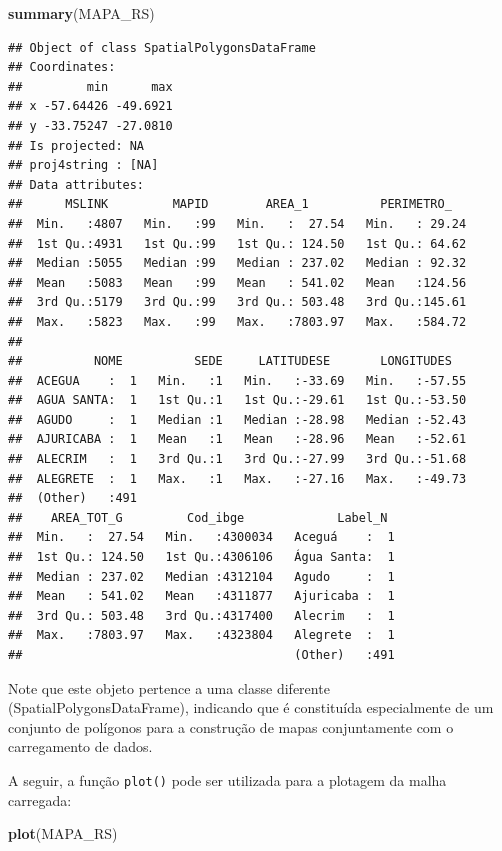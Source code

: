 \documentclass[12pt,brazil,]{book}
\newenvironment{Shaded}{\begin{snugshade}}{\end{snugshade}}
\newcommand{\KeywordTok}[1]{\textcolor[rgb]{0.13,0.29,0.53}{\textbf{#1}}}
\newcommand{\NormalTok}[1]{#1}
\begin{document}
\begin{Shaded}
\begin{Highlighting}[]
\KeywordTok{summary}\NormalTok{(MAPA_RS)}
\end{Highlighting}
\end{Shaded}

\begin{verbatim}
## Object of class SpatialPolygonsDataFrame
## Coordinates:
##         min      max
## x -57.64426 -49.6921
## y -33.75247 -27.0810
## Is projected: NA 
## proj4string : [NA]
## Data attributes:
##      MSLINK         MAPID        AREA_1          PERIMETRO_    
##  Min.   :4807   Min.   :99   Min.   :  27.54   Min.   : 29.24  
##  1st Qu.:4931   1st Qu.:99   1st Qu.: 124.50   1st Qu.: 64.62  
##  Median :5055   Median :99   Median : 237.02   Median : 92.32  
##  Mean   :5083   Mean   :99   Mean   : 541.02   Mean   :124.56  
##  3rd Qu.:5179   3rd Qu.:99   3rd Qu.: 503.48   3rd Qu.:145.61  
##  Max.   :5823   Max.   :99   Max.   :7803.97   Max.   :584.72  
##                                                                
##          NOME          SEDE     LATITUDESE       LONGITUDES    
##  ACEGUA    :  1   Min.   :1   Min.   :-33.69   Min.   :-57.55  
##  AGUA SANTA:  1   1st Qu.:1   1st Qu.:-29.61   1st Qu.:-53.50  
##  AGUDO     :  1   Median :1   Median :-28.98   Median :-52.43  
##  AJURICABA :  1   Mean   :1   Mean   :-28.96   Mean   :-52.61  
##  ALECRIM   :  1   3rd Qu.:1   3rd Qu.:-27.99   3rd Qu.:-51.68  
##  ALEGRETE  :  1   Max.   :1   Max.   :-27.16   Max.   :-49.73  
##  (Other)   :491                                                
##    AREA_TOT_G         Cod_ibge             Label_N   
##  Min.   :  27.54   Min.   :4300034   Aceguá    :  1  
##  1st Qu.: 124.50   1st Qu.:4306106   Água Santa:  1  
##  Median : 237.02   Median :4312104   Agudo     :  1  
##  Mean   : 541.02   Mean   :4311877   Ajuricaba :  1  
##  3rd Qu.: 503.48   3rd Qu.:4317400   Alecrim   :  1  
##  Max.   :7803.97   Max.   :4323804   Alegrete  :  1  
##                                      (Other)   :491
\end{verbatim}

Note que este objeto pertence a uma classe diferente
(SpatialPolygonsDataFrame), indicando que é constituída especialmente de
um conjunto de polígonos para a construção de mapas conjuntamente com o
carregamento de dados.

A seguir, a função \texttt{plot()} pode ser utilizada para a plotagem da
malha carregada:

\begin{Shaded}
\begin{Highlighting}[]
\KeywordTok{plot}\NormalTok{(MAPA_RS)}
\end{Highlighting}
\end{Shaded}
\end{document}
